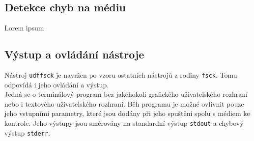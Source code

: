 \subsection{Detekce chyb na médiu}
Lorem ipsum

\subsection{Výstup a ovládání nástroje}
Nástroj \texttt{udffsck} je navržen po vzoru ostatních nástrojů z rodiny \texttt{fsck}. Tomu odpovídá i jeho ovládání a výstup.\\
Jedná se o terminálový program bez jakéhokoli grafického uživatelského rozhraní nebo i textového uživatelského rozhraní. Běh programu je možné ovlivnit pouze jeho vstupními parametry, které jsou dodány při jeho spuštění spolu s médiem ke kontrole. Jeho výstupy jsou směrovány na standardní výstup \texttt{stdout} a chybový výstup \texttt{stderr}.

